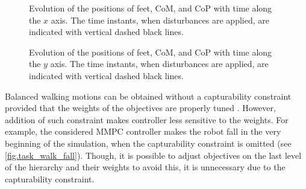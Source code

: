 \begin{figure}[!htbp]
    \begin{minipage}[t]{\textwidth}
    \end{minipage}
    \begin{minipage}[t]{\textwidth}
    \end{minipage}
    \caption[Evolution of the feet, CoM, and CoP positions with time along the $x$ axis.]{
        Evolution of the positions of feet, \ac{CoM}, and \ac{CoP} with time
        along the $x$ axis. The time instants, when disturbances are applied,
        are indicated with vertical dashed black lines.
    }
    \label{fig.task_walk_steps_time_x}
\end{figure}


\begin{figure}[!htbp]
    \begin{minipage}[t]{\textwidth}
    \end{minipage}
    \begin{minipage}[t]{\textwidth}
    \end{minipage}
    \caption[Evolution of the feet, CoM, and CoP positions with time along the $y$ axis.]{
        Evolution of the positions of feet, \ac{CoM}, and \ac{CoP} with time
        along the $y$ axis. The time instants, when disturbances are applied,
        are indicated with vertical dashed black lines.
    }
    \label{fig.task_walk_steps_time_y}
\end{figure}


Balanced walking motions can be obtained without a capturability constraint
provided that the weights of the objectives are properly tuned
\cite{Wieber2008iros,Herdt2010auro}. However, addition of such constraint makes
controller less sensitive to the weights. For example, the considered \ac{MMPC}
controller makes the robot fall in the very beginning of the simulation, when
the capturability constraint is omitted (see \cref{fig.task_walk_fall}).
Though, it is possible to adjust objectives on the last level of the hierarchy
and their weights to avoid this, it is unnecessary due to the capturability
constraint.


